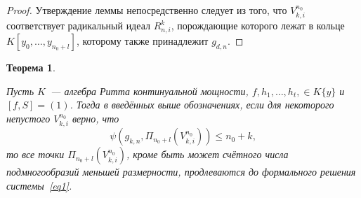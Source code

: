 \documentclass[16pt]{article}
\renewcommand{\le}{\leqslant} %
\theoremstyle{plain1}
\theoremstyle{plain2}
\theoremstyle{plain}
\newtheorem{theorem}{Теорема}
\theoremstyle{plain3}
\theoremstyle{definition}
\theoremstyle{remark}
\begin{document}
\begin{proof}
Утверждение леммы непосредственно следует из того, что ${V}_{k,i}^{n_0}$ соответствует радикальный идеал $R_{n,i}^k$, порождающие которого лежат в кольце $K[y_0,\ldots,y_{n_0+l}]$, которому также принадлежит $g_{d,n}$.
\end{proof}


\begin{theorem}\label{theorem:general th1}

Пусть $K$~--- алгебра Ритта континуальной мощности, $f,h_1,\ldots,h_t,\in K\{y\}$ и $[f,S]=(1)$. Тогда в введённых выше обозначениях, если для некоторого непустого ${V}_{k,i}^{n_0}$ верно, что
\begin{equation}
\psi(g_{k,n},\Pi_{n_0+l}({V}_{k,i}^{n_0}))\le n_0+k,
\end{equation}
то все точки $\Pi_{n_0+l}({V}_{k,i}^{n_0})$, кроме быть может счётного числа подмногообразий меньшей размерности, продлеваются до формального решения системы~\eqref{eq1}.
\end{theorem}
\end{document}
